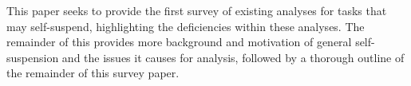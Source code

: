 This paper seeks to provide the first survey of existing analyses for tasks that may self-suspend, highlighting the deficiencies within these analyses. The remainder of this \mysectionrefnormal{} provides more background and motivation of general self-suspension and the issues it causes for analysis, followed by a thorough outline of the remainder of this survey paper.




